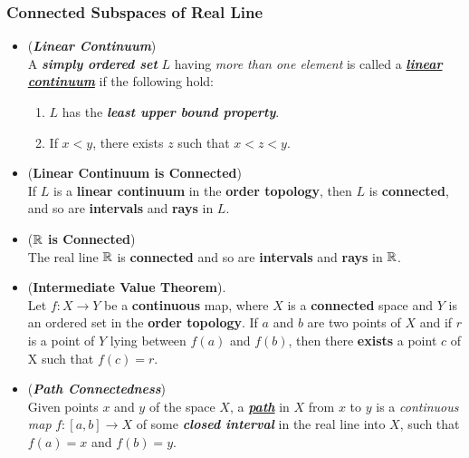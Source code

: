 \documentclass[11pt]{article}
\begin{document}
\subsubsection{Connected Subspaces of Real Line}
\begin{itemize}
\item \begin{definition}(\textbf{\emph{Linear Continuum}}) \\
A \emph{\textbf{simply ordered set}} $L$ having \emph{more than one element} is called a \underline{\emph{\textbf{linear continuum}}} if the following hold:
\begin{enumerate}
\item $L$ has the \emph{\textbf{least upper bound property}}.
\item If $x < y$, there exists $z$ such that $x < z < y$.
\end{enumerate}
\end{definition}

\item \begin{proposition} (\textbf{Linear Continuum is Connected}) \citep{munkres2000topology} \\
If $L$ is a \textbf{linear continuum} in the \textbf{order topology}, then $L$ is \textbf{connected}, and so are \textbf{intervals} and \textbf{rays} in $L$.
\end{proposition}


\item \begin{corollary} (\textbf{${\mathbb R}$ is Connected})\\
The real line ${\mathbb R}$ is \textbf{connected} and so are \textbf{intervals} and \textbf{rays} in ${\mathbb R}$.
\end{corollary}

\item \begin{theorem} (\textbf{Intermediate Value Theorem}).  \citep{munkres2000topology}\\
Let $f : X \rightarrow Y$ be a \textbf{continuous} map, where $X$ is a \textbf{connected} space and $Y$ is an ordered set in the \textbf{order topology}. If $a$ and $b$ are two points of $X$ and if $r$ is a point of $Y$ lying between $f(a)$ and $f(b)$, then there \textbf{exists} a point $c$ of X such that $f(c) = r$.
\end{theorem}


\item \begin{definition} (\emph{\textbf{Path Connectedness}})\\
Given points $x$ and $y$ of the space $X$, a \underline{\emph{\textbf{path}}} in $X$ from $x$ to $y$ is a \emph{continuous map} $f : [a, b] \rightarrow X$ of some \emph{\textbf{closed interval}} in the real line into $X$, such that $f(a) = x$ and $f(b) = y$. 


\end{definition}
\end{itemize}
\end{document}
